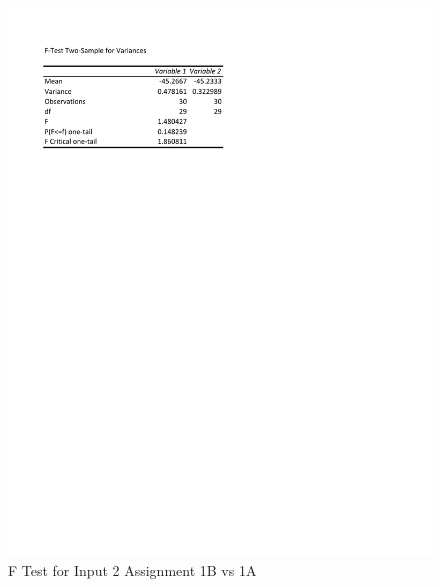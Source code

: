 \documentclass[times]{article}
\begin{document}
	\begin{figure}
		\caption{F Test for Input 2 Assignment 1B vs 1A}
		\label{fig:f_test2}
		\includegraphics[width=\textwidth]{./tests/Input2_f_test.pdf}
	\end{figure}
\end{document}
